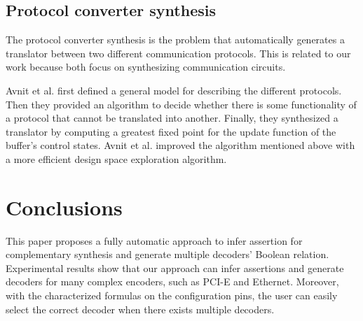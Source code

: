 \documentclass[journal]{IEEEtran}
\begin{document}
%





\subsection{Protocol converter synthesis}
The protocol converter synthesis is the problem that automatically generates a translator between two different communication protocols.
This is related to our work because both focus on synthesizing communication circuits.

Avnit et al. \cite{converter_date08} first defined a general model for describing the different protocols.
Then they provided an algorithm to decide
whether there is  some functionality of a protocol that cannot be translated into another.
Finally,
they synthesized a translator by computing a greatest fixed point for the update function of the buffer's control states.
Avnit et al.\cite{converter_date09} improved the algorithm mentioned above with a more efficient design space exploration algorithm.



\section{Conclusions}\label{sec_conclude}

This paper proposes a fully automatic approach to infer assertion for complementary synthesis and generate multiple decoders' Boolean relation.
Experimental results show that our approach can infer assertions and generate decoders for many complex encoders,
such as PCI-E\cite{PCIESPEC} and Ethernet\cite{IEEE80232002}.
Moreover,
with the characterized formulas on the configuration pins,
the user can easily select the correct decoder when there exists multiple decoders.
\end{document}
